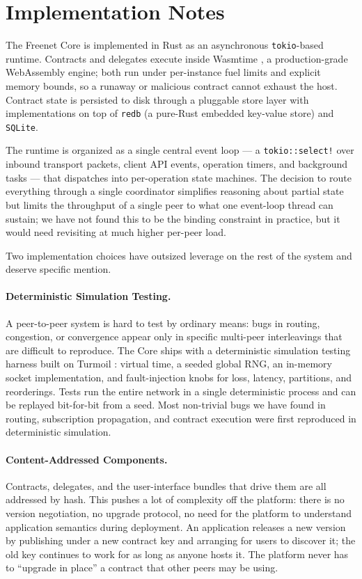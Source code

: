 \section{Implementation Notes}
\label{sec:implementation}

The Freenet Core is implemented in Rust as an asynchronous \texttt{tokio}-based runtime. Contracts and delegates execute inside Wasmtime \citep{wasmtime}, a production-grade WebAssembly engine; both run under per-instance fuel limits and explicit memory bounds, so a runaway or malicious contract cannot exhaust the host. Contract state is persisted to disk through a pluggable store layer with implementations on top of \texttt{redb} (a pure-Rust embedded key-value store) and \texttt{SQLite}.

The runtime is organized as a single central event loop --- a \texttt{tokio::select!} over inbound transport packets, client API events, operation timers, and background tasks --- that dispatches into per-operation state machines. The decision to route everything through a single coordinator simplifies reasoning about partial state but limits the throughput of a single peer to what one event-loop thread can sustain; we have not found this to be the binding constraint in practice, but it would need revisiting at much higher per-peer load.

Two implementation choices have outsized leverage on the rest of the system and deserve specific mention.

\paragraph{Deterministic Simulation Testing.} A peer-to-peer system is hard to test by ordinary means: bugs in routing, congestion, or convergence appear only in specific multi-peer interleavings that are difficult to reproduce. The Core ships with a deterministic simulation testing harness built on Turmoil \citep{turmoil}: virtual time, a seeded global RNG, an in-memory socket implementation, and fault-injection knobs for loss, latency, partitions, and reorderings. Tests run the entire network in a single deterministic process and can be replayed bit-for-bit from a seed. Most non-trivial bugs we have found in routing, subscription propagation, and contract execution were first reproduced in deterministic simulation.

\paragraph{Content-Addressed Components.} Contracts, delegates, and the user-interface bundles that drive them are all addressed by hash. This pushes a lot of complexity off the platform: there is no version negotiation, no upgrade protocol, no need for the platform to understand application semantics during deployment. An application releases a new version by publishing under a new contract key and arranging for users to discover it; the old key continues to work for as long as anyone hosts it. The platform never has to ``upgrade in place'' a contract that other peers may be using.

